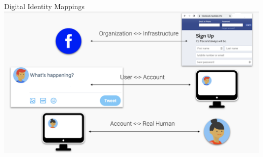 \documentclass[nobackground,dvipsnames,table]{beamer}
\begin{document}
\begin{frame}{Digital Identity Mappings}
    \includegraphics[width=\textwidth]{digital-identity-mappings}
\end{frame}
\end{document}
